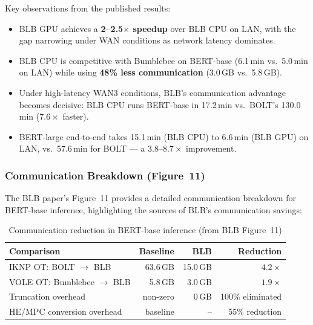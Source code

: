 Key observations from the published results:
\begin{itemize}[nosep]
  \item BLB GPU achieves a \textbf{2--2.5$\times$ speedup} over BLB CPU on LAN, with the gap narrowing under WAN conditions as network latency dominates.
  \item BLB CPU is competitive with Bumblebee on BERT-base (6.1\,min vs.\ 5.0\,min on LAN) while using \textbf{48\% less communication} (3.0\,GB vs.\ 5.8\,GB).
  \item Under high-latency WAN3 conditions, BLB's communication advantage becomes decisive: BLB CPU runs BERT-base in 17.2\,min vs.\ BOLT's 130.0\,min ($7.6\times$ faster).
  \item BERT-large end-to-end takes 15.1\,min (BLB CPU) to 6.6\,min (BLB GPU) on LAN, vs.\ 57.6\,min for BOLT --- a $3.8$--$8.7\times$ improvement.
\end{itemize}

\subsubsection{Communication Breakdown (Figure~11)}

The BLB paper's Figure~11 provides a detailed communication breakdown for BERT-base inference, highlighting the sources of BLB's communication savings:

\begin{table}[ht]
\centering
\caption{Communication reduction in BERT-base inference (from BLB Figure~11)}
\label{tab:comm-breakdown}
\begin{tabular}{lrrr}
\toprule
\textbf{Comparison} & \textbf{Baseline} & \textbf{BLB} & \textbf{Reduction} \\
\midrule
IKNP OT: BOLT $\to$ BLB          & 63.6\,GB & 15.0\,GB & $4.2\times$ \\
VOLE OT: Bumblebee $\to$ BLB     & 5.8\,GB  & 3.0\,GB  & $1.9\times$ \\
Truncation overhead               & non-zero & 0\,GB    & 100\% eliminated \\
HE/MPC conversion overhead        & baseline & --       & 55\% reduction \\
\bottomrule
\end{tabular}
\end{table}

